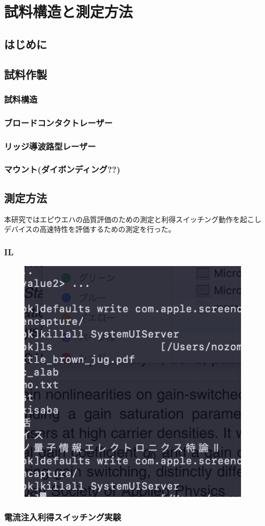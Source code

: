 \chapter{試料構造と測定方法}
\label{chap:simulation}

\section{はじめに}

\section{試料作製}
\subsection{試料構造}
\subsection{ブロードコンタクトレーザー}
\subsection{リッジ導波路型レーザー}
\subsection{マウント(ダイボンディング??)}
\section{測定方法}
本研究ではエピウエハの品質評価のための測定と利得スイッチング動作を起こしデバイスの高速特性を評価するための測定を行った。
\subsection{IL}
\begin{figure}
	\includegraphics{スクリーンショット_2018-12-01 16.51.41.png}
\end{figure}
\subsection{電流注入利得スイッチング実験}
